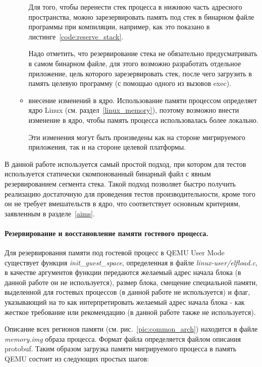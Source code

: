 \begin{itemize}
\begin{itemize}
        Для того, чтобы перенести стек процесса в нижнюю часть адресного пространства, можно зарезервировать память под стек в бинарном файле программы при компиляции, например, как это показано в листинге~\ref{code:reserve_stack}.

        Надо отметить, что резервирование стека не обязательно предусматривать в самом бинарном файле, для этого возможно разработать отдельное приложение, цель которого зарезервировать стек, после чего загрузить в память целевую программу (с помощью одного из вызовов exec).

        \item внесение изменений в ядро. Использование памяти процессом определяет ядро Linux (см. раздел~\ref{linux_memory}), поэтому возможно внести изменение в ядро, чтобы память процесса использовалась более локально.

        Эти изменения могут быть произведены как на стороне мигрируемого приложения, так и на стороне целевой платформы.

    \end{itemize}

\end{itemize}

В данной работе используется самый простой подход, при котором для тестов используется статически скомпонованный бинарный файл с явным резервированием сегмента стека. Такой подход позволяет быстро получить реализацию достаточную для проведения тестов производительности, кроме того он не требует вмешательств в ядро, что соответствует основным критериям, заявленным в разделе~\ref{aims}.

\paragraph{Резервирование и восстановление памяти гостевого процесса.}

Для резервирования памяти под гостевой процесс в QEMU User Mode существует функция \textit{init\_guest\_space}, определенная в файле \textit{linux-user/elfload.c}, в качестве аргументов функции передаются желаемый адрес начала блока (в данной работе он не используется), размер блока, смещение специальной памяти, выделенной для гостевых процессов (в данной работе не используется) и флаг, указывающий на то как интерпретировать желаемый адрес начала блока - как жесткое требование или рекомендацию (в данной работе также не используется).

Описание всех регионов памяти (см. рис.~\ref{pic:common_arch}) находится в файле \textit{memory.img} образа процесса. Формат файла определяется файлом описания protobuf. Таким образом загрузка памяти мигрируемого процесса в память QEMU состоит из следующих простых шагов:


